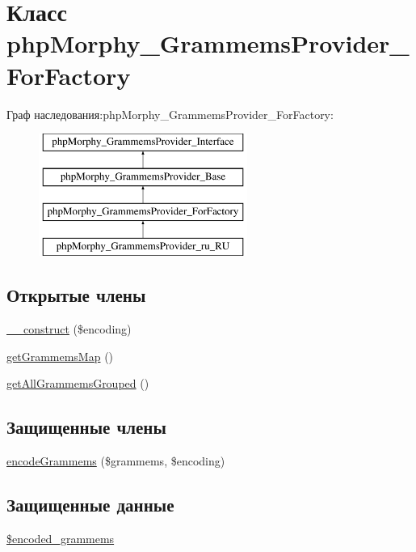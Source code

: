 \hypertarget{classphpMorphy__GrammemsProvider__ForFactory}{
\section{Класс phpMorphy\_\-GrammemsProvider\_\-ForFactory}
\label{classphpMorphy__GrammemsProvider__ForFactory}
}
Граф наследования:phpMorphy\_\-GrammemsProvider\_\-ForFactory:\begin{figure}[H]
\begin{center}
\leavevmode
\includegraphics[height=4.000000cm]{classphpMorphy__GrammemsProvider__ForFactory}
\end{center}
\end{figure}
\subsection*{Открытые члены}
\begin{DoxyCompactItemize}
\item 
\hyperlink{classphpMorphy__GrammemsProvider__ForFactory_a64a17c5df507c550eb846a2435d60d0c}{\_\-\_\-construct} (\$encoding)
\item 
\hyperlink{classphpMorphy__GrammemsProvider__ForFactory_a4127fa58854c2554fbfdc5ebe8878557}{getGrammemsMap} ()
\item 
\hyperlink{classphpMorphy__GrammemsProvider__ForFactory_aea61ff6b9d13f92308dfade9c58a3d8b}{getAllGrammemsGrouped} ()
\end{DoxyCompactItemize}
\subsection*{Защищенные члены}
\begin{DoxyCompactItemize}
\item 
\hyperlink{classphpMorphy__GrammemsProvider__ForFactory_a3db4b4e7c4ba8e3b87487439220f382c}{encodeGrammems} (\$grammems, \$encoding)
\end{DoxyCompactItemize}
\subsection*{Защищенные данные}
\begin{DoxyCompactItemize}
\item 
\hyperlink{classphpMorphy__GrammemsProvider__ForFactory_a1817f62dd731f456821527ac500f3f05}{\$encoded\_\-grammems}
\end{DoxyCompactItemize}


